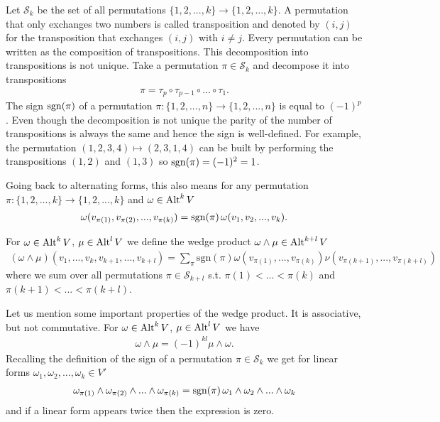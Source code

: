 \documentclass[../main.tex]{subfiles}
\begin{document}
Let $\mathcal{S}_k$ be the set of all permutations 
$\{ 1, 2, ..., k\} \rightarrow \{ 1, 2, ..., k \}$. A 
permutation that only exchanges two numbers is called transposition 
and denoted by $(i,j)$ for the transposition that exchanges $(i,j)$ with 
$i \neq j$. Every permutation can be written as the composition of 
transpositions. This decomposition into transpositions is not unique.
Take a permutation $\pi \in \mathcal{S}_k$ and decompose it into transpositions
\begin{align*}
    \pi = \tau_p \circ \tau_{p-1} \circ ... \circ \tau_1.
\end{align*}
The sign $\operatorname{sgn}(\pi)$ of a permutation 
$\pi: \{ 1,2,...,n\} \rightarrow \{ 1,2, ..., n\}$ is equal to $(-1)^p$.
Even though the decomposition is not unique the parity of the number of
transpositions is always the same and hence the sign is well-defined.
For example, the permutation $(1,2,3,4) \mapsto (2,3,1,4)$ 
can be built by performing the transpositions $(1,2)$ and $(1,3)$ so 
$\operatorname{sgn}(\pi) = (-1)^2 = 1$. 

Going back to alternating forms, this also means for any permutation 
$\pi: \{1,2,...,k\} \rightarrow \{1,2,...,k\}$ and 
$\omega \in {\text{Alt}^{k}\,V}$
\begin{align*}
    \omega(v_{\pi(1)},v_{\pi(2)},...,v_{\pi(k)})
    = \operatorname{sgn}(\pi)\, \omega(v_1, v_2,..., v_k).
\end{align*}

\begin{definition}
    For $\omega \in 
    {\text{Alt}^{k}\,V}$, $\mu \in 
    {\text{Alt}^{l}\,V}$ we define the wedge product $\omega \wedge \mu \in 
    {\text{Alt}^{k+l}\,V}$ 
    \begin{align*}
        (\omega \wedge \mu) (v_1,...,v_k,v_{k+1},...,v_{k+l}) =
        \sum\limits_\pi
        \text{sgn}(\pi) \omega(v_{\pi(1)},...,v_{\pi(k)}) 
        \nu(v_{\pi(k+1)},...,v_{\pi(k+l)})
    \end{align*}
    where we sum over all permutations 
    $\pi \in \mathcal{S}_{k+l}$ 
    s.t. $\pi(1) < ... < \pi(k)$ and $\pi(k+1) < ... < \pi(k+l)$.        
\end{definition}

Let us mention some important properties of the wedge product. It is 
associative, but not commutative. For $\omega \in 
{\text{Alt}^{k}\,V}$, $\mu \in 
{\text{Alt}^{l}\,V}$ we have 
\begin{align}
    \omega \wedge \mu = (-1)^{kl} \mu \wedge \omega. \label{eq:commutativity_wedge_product}
\end{align}
Recalling the definition of the sign of a permutation $\pi \in \mathcal{S}_k$ 
we get for linear forms $\omega_1, \omega_2, ..., \omega_k \in V'$
\begin{align*}
    \omega_{\pi(1)} \wedge \omega_{\pi(2)} \wedge ... \wedge \omega_{\pi(k)}
    = \operatorname{sgn}(\pi) \, \omega_1 \wedge \omega_2 \wedge ... \wedge \omega_k
\end{align*}
and if a linear form appears twice then the expression is zero.
\end{document}

